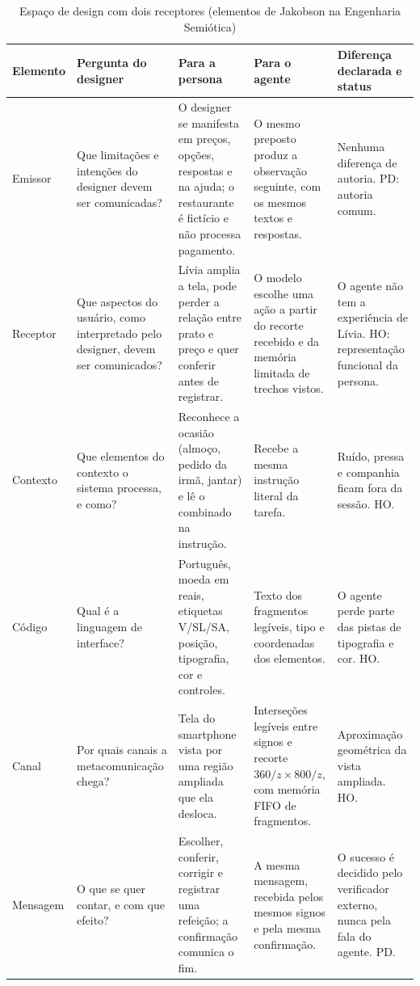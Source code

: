 \begin{table}[!t]
\caption{Espaço de design com dois receptores (elementos de Jakobson na Engenharia Semiótica)}
\label{tab:jakobson}
\centering\scriptsize\setlength{\tabcolsep}{3pt}\renewcommand{\arraystretch}{1.1}
\begin{tabularx}{\textwidth}{@{}>{\raggedright\arraybackslash}p{}>{\raggedright\arraybackslash}p{}>{\raggedright\arraybackslash}X>{\raggedright\arraybackslash}X>{\raggedright\arraybackslash}p{}@{}}
\hline \textbf{Elemento} & \textbf{Pergunta do designer} & \textbf{Para a persona} & \textbf{Para o agente} & \textbf{Diferença declarada e status}\\ \hline
Emissor & Que limitações e intenções do designer devem ser comunicadas? & O designer se manifesta em preços, opções, respostas e na ajuda; o restaurante é fictício e não processa pagamento. & O mesmo preposto produz a observação seguinte, com os mesmos textos e respostas. & Nenhuma diferença de autoria. PD: autoria comum.\\
Receptor & Que aspectos do usuário, como interpretado pelo designer, devem ser comunicados? & Lívia amplia a tela, pode perder a relação entre prato e preço e quer conferir antes de registrar. & O modelo escolhe uma ação a partir do recorte recebido e da memória limitada de trechos vistos. & O agente não tem a experiência de Lívia. HO: representação funcional da persona.\\
Contexto & Que elementos do contexto o sistema processa, e como? & Reconhece a ocasião (almoço, pedido da irmã, jantar) e lê o combinado na instrução. & Recebe a mesma instrução literal da tarefa. & Ruído, pressa e companhia ficam fora da sessão. HO.\\
Código & Qual é a linguagem de interface? & Português, moeda em reais, etiquetas V/SL/SA, posição, tipografia, cor e controles. & Texto dos fragmentos legíveis, tipo e coordenadas dos elementos. & O agente perde parte das pistas de tipografia e cor. HO.\\
Canal & Por quais canais a metacomunicação chega? & Tela do smartphone vista por uma região ampliada que ela desloca. & Interseções legíveis entre signos e recorte $360/z\times800/z$, com memória FIFO de fragmentos. & Aproximação geométrica da vista ampliada. HO.\\
Mensagem & O que se quer contar, e com que efeito? & Escolher, conferir, corrigir e registrar uma refeição; a confirmação comunica o fim. & A mesma mensagem, recebida pelos mesmos signos e pela mesma confirmação. & O sucesso é decidido pelo verificador externo, nunca pela fala do agente. PD.\\ \hline
\end{tabularx}
\end{table}
